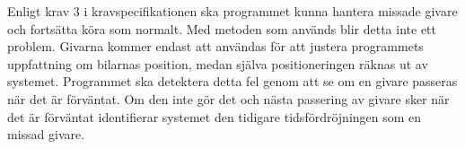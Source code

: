 Enligt krav 3 i kravspecifikationen ska programmet kunna hantera missade givare
och fortsätta köra som normalt. Med metoden som används blir detta inte ett
problem.  Givarna kommer endast att användas för att justera programmets
uppfattning om bilarnas position, medan själva positioneringen räknas ut av
systemet. Programmet ska detektera detta fel genom att se om en givare passeras
när det är förväntat. Om den inte gör det och nästa passering av givare sker när
det är förväntat identifierar systemet den tidigare tidsfördröjningen som en
missad givare.
